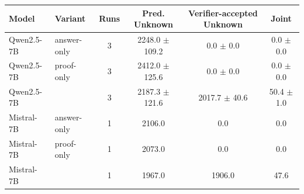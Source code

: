 \begin{tabular}{llcccc}
\toprule
Model & Variant & Runs & Pred. Unknown & Verifier-accepted Unknown & Joint \\
\midrule
Qwen2.5-7B & answer-only & 3 & 2248.0 $\pm$ 109.2 & 0.0 $\pm$ 0.0 & 0.0 $\pm$ 0.0 \\
Qwen2.5-7B & proof-only & 3 & 2412.0 $\pm$ 125.6 & 0.0 $\pm$ 0.0 & 0.0 $\pm$ 0.0 \\
Qwen2.5-7B & \model{} & 3 & 2187.3 $\pm$ 121.6 & 2017.7 $\pm$ 40.6 & 50.4 $\pm$ 1.0 \\
\midrule
Mistral-7B & answer-only & 1 & 2106.0 & 0.0 & 0.0 \\
Mistral-7B & proof-only & 1 & 2073.0 & 0.0 & 0.0 \\
Mistral-7B & \model{} & 1 & 1967.0 & 1906.0 & 47.6 \\
\bottomrule
\end{tabular}